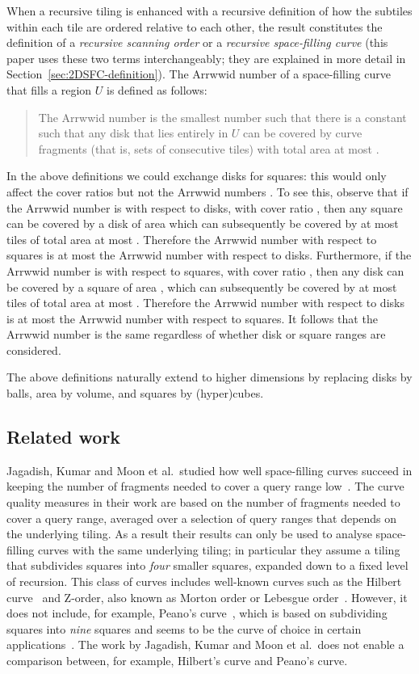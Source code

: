 \documentclass[11pt,a4paper]{article}
\newcommand{\unittile}{\ensuremath{U}\xspace}
\begin{document}
When a recursive tiling is enhanced with a recursive definition of how the subtiles within each tile are ordered relative to each other, the result constitutes the definition of a \emph{recursive scanning order} or a \emph{recursive space-filling curve} (this paper uses these two terms interchangeably; they are explained in more detail in Section~\ref{sec:2DSFC-definition}). The Arrwwid number of a space-filling curve that fills a region \unittile is defined as follows:\begin{quote}
The Arrwwid number is the smallest number  such that there is a constant  such that any disk  that lies entirely in \unittile can be covered by  curve fragments (that is, sets of consecutive tiles) with total area at most .
\end{quote}

In the above definitions we could exchange disks for squares: this would only affect the cover ratios  but not the Arrwwid numbers . To see this, observe that if the Arrwwid number is  with respect to disks, with cover ratio , then any square  can be covered by a disk of area  which can subsequently be covered by at most  tiles of total area at most . Therefore the Arrwwid number with respect to squares is at most the Arrwwid number with respect to disks. Furthermore, if the Arrwwid number is  with respect to squares, with cover ratio , then any disk  can be covered by a square of area , which can subsequently be covered by at most  tiles of total area at most . Therefore the Arrwwid number with respect to disks is at most the Arrwwid number with respect to squares. It follows that the Arrwwid number is the same regardless of whether disk or square ranges are considered.

The above definitions naturally extend to higher dimensions by replacing disks by balls, area by volume, and squares by (hyper)cubes.

\subsection{Related work}
Jagadish, Kumar and Moon et al.\ studied how well space-filling curves succeed in keeping the number of fragments needed to cover a query range low~\cite{Jagadish1990,Jagadish1997,Kumar1994,Moon2001}. The curve quality measures in their work are based on the number of fragments needed to cover a query range, averaged over a selection of query ranges that depends on the underlying tiling. As a result their results can only be used to analyse space-filling curves with the same underlying tiling; in particular they assume a tiling that subdivides squares into \emph{four} smaller squares, expanded down to a fixed level of recursion. This class of curves includes well-known curves such as the Hilbert curve~\cite{Hilbert1891} and Z-order, also known as Morton order or Lebesgue order~\cite{Lebesgue1904}. However, it does not include, for example, Peano's curve~\cite{Peano1890}, which is based on subdividing squares into \emph{nine} squares and seems to be the curve of choice in certain applications~\cite{Bader2006a,Voorhies1991}. The work by Jagadish, Kumar and Moon et al.\ does not enable a comparison between, for example, Hilbert's curve and Peano's curve.
\end{document}

